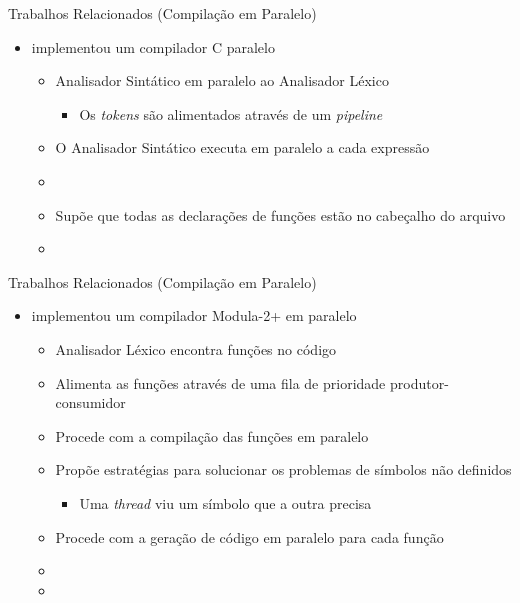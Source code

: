 \begin{frame}{Trabalhos Relacionados (Compilação em Paralelo)}
    \begin{itemize}
        \item \cite{vandevoorde1988parallel} implementou um compilador C paralelo
            \begin{itemize}
                \item Analisador Sintático em paralelo ao Analisador Léxico
                    \begin{itemize}
                        \item Os \textit{tokens} são alimentados através de um \textit{pipeline}
                    \end{itemize}
                \item O Analisador Sintático executa em paralelo a cada expressão
                \item[]
                \item Supõe que todas as declarações de funções estão no cabeçalho do arquivo
                \item {\color{red}{Não discute otimização}}
            \end{itemize}
    \end{itemize}
\end{frame}

\begin{frame}{Trabalhos Relacionados (Compilação em Paralelo)}
    \begin{itemize}
        \item \cite{wortman1992} implementou um compilador Modula-2+ em paralelo
            \begin{itemize}
                \item Analisador Léxico encontra funções no código
                \item Alimenta as funções através de uma fila de prioridade produtor-consumidor
                \item Procede com a compilação das funções em paralelo
                \item Propõe estratégias para solucionar os problemas de símbolos não definidos
                    \begin{itemize}
                        \item Uma \textit{thread} viu um símbolo que a outra precisa
                    \end{itemize}
                \item Procede com a geração de código em paralelo para cada função
                \item[]
                \item {\color{red}{Não discute otimização}}
            \end{itemize}
    \end{itemize}
\end{frame}

